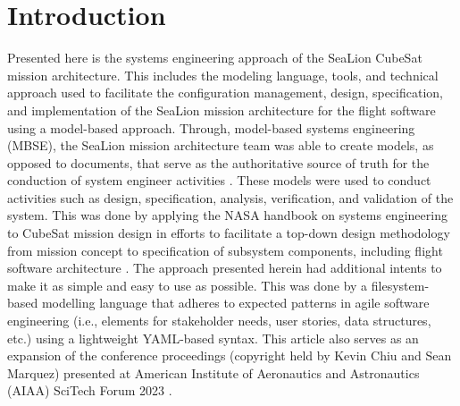 \documentclass[journal,article,submit,pdftex,moreauthors]{Definitions/mdpi}
\begin{document}

\section{Introduction}

Presented here is the systems engineering approach of the SeaLion CubeSat mission architecture.  This includes the modeling language, tools, and technical approach used to facilitate the configuration management, design, specification, and implementation of the SeaLion mission architecture for the flight software using a model-based approach.  Through, model-based systems engineering (MBSE), the SeaLion mission architecture team was able to create models, as opposed to documents, that serve as the authoritative source of truth for the conduction of system engineer activities \cite{architecting_spacecraft}.  These models were used to conduct activities such as design, specification, analysis, verification, and validation of the system.  This was done by applying the NASA handbook on systems engineering \cite{nasa_handbook} to CubeSat mission design in efforts to facilitate a top-down design methodology from mission concept to specification of subsystem components, including flight software architecture \cite{asundi13_cubes}.  The approach presented herein had additional intents to make it as simple and easy to use as possible.  This was done by a filesystem-based modelling language that adheres to expected patterns in agile software engineering (i.e., elements for stakeholder needs, user stories, data structures, etc.) using a lightweight YAML-based syntax.  This article also serves as an expansion of the conference proceedings (copyright held by Kevin Chiu and Sean Marquez) presented at American Institute of Aeronautics and Astronautics (AIAA) SciTech Forum 2023 \cite{scitech_proceeding}.
\end{document}
